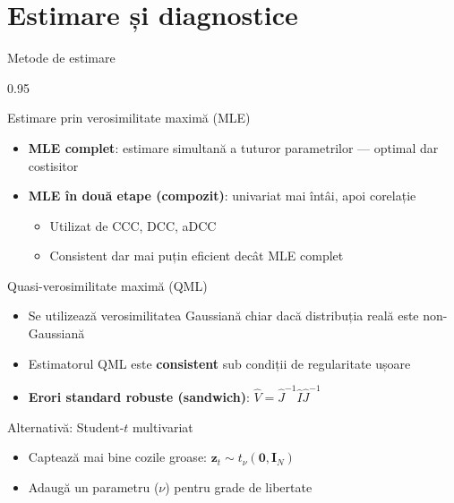 \documentclass[9pt, aspectratio=169, t]{beamer}
\begin{document}
\section{Estimare și diagnostice}

\begin{frame}{Metode de estimare}
    \begin{cminipage}{0.95\textwidth}
    {\footnotesize
    \begin{block}{Estimare prin verosimilitate maximă (MLE)}
        \begin{itemize}\setlength{\itemsep}{0pt}
            \item \textbf{MLE complet}: estimare simultană a tuturor parametrilor --- optimal dar costisitor
            \item \textbf{MLE în două etape (compozit)}: univariat mai întâi, apoi corelație
                \begin{itemize}\setlength{\itemsep}{0pt}
                    \item Utilizat de CCC, DCC, aDCC
                    \item Consistent dar mai puțin eficient decât MLE complet
                \end{itemize}
        \end{itemize}
    \end{block}
    \begin{block}{Quasi-verosimilitate maximă (QML)}
        \begin{itemize}\setlength{\itemsep}{0pt}
            \item Se utilizează verosimilitatea Gaussiană chiar dacă distribuția reală este non-Gaussiană
            \item Estimatorul QML este \textbf{consistent} sub condiții de regularitate ușoare
            \item \textbf{Erori standard robuste (sandwich)}: $\hat{V} = \hat{J}^{-1}\hat{I}\hat{J}^{-1}$
        \end{itemize}
    \end{block}
    \begin{block}{Alternativă: Student-$t$ multivariat}
        \begin{itemize}\setlength{\itemsep}{0pt}
            \item Captează mai bine cozile groase: $\mathbf{z}_t \sim t_\nu(\mathbf{0}, \mathbf{I}_N)$
            \item Adaugă un parametru ($\nu$) pentru grade de libertate
        \end{itemize}
    \end{block}
    }
    \end{cminipage}
\end{frame}
\end{document}
